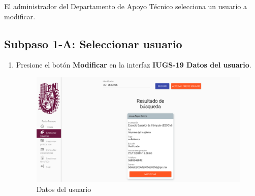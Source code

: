 El administrador del Departamento de Apoyo Técnico selecciona un usuario a modificar.

\subsection{Subpaso 1-A: Seleccionar usuario}
\begin{enumerate}
	\item Presione el botón \textbf{Modificar} en la interfaz
    \textbf{IUGS-19 Datos del usuario}.
     \begin{figure}[hbtp]
	\includegraphics[scale=0.3]{images/Interfaz/IUGS-19 Datos del usuario.png}
	\caption{Datos del usuario}
	\end{figure}
\end{enumerate}